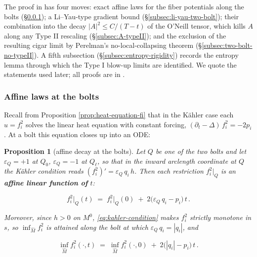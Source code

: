 \documentclass[11pt]{amsart}
\theoremstyle{plain}
\numberwithin{equation}{section}
\newtheorem{proposition}[theorem]{Proposition}
\theoremstyle{definition}
\theoremstyle{remark}
\begin{document}
The proof in \cite{FT} has four moves: exact affine laws for the fiber potentials along the bolts (\S\ref{subsec:bolt-affine}); a Li--Yau-type gradient bound (\S\ref{subsec:li-yau-two-bolt}); their combination into the decay $| A |^2 \leq C / ( T - t )$ of the O'Neill tensor, which kills $A$ along any Type II rescaling (\S\ref{subsec:A-typeII}); and the exclusion of the resulting cigar limit by Perelman's no-local-collapsing theorem (\S\ref{subsec:two-bolt-no-typeII}). A fifth subsection (\S\ref{subsec:entropy-rigidity}) records the entropy lemma through which the Type I blow-up limits are identified. We quote the statements used later; all proofs are in \cite{FT}.

\subsubsection{Affine laws at the bolts}\label{subsec:bolt-affine}


Recall from Proposition \ref{prop:heat-equation-fi} that in the Kähler case each $u = f_i^2$ solves the linear heat equation with constant forcing, $( \partial_t - \Delta )\, f_i^2 = -2 p_i$. At a bolt this equation closes up into an ODE:

\begin{proposition}[affine decay at the bolts]\label{prop:bolt-affine}
	Let $Q$ be one of the two bolts and let $\varepsilon_Q = +1$ at $Q_0$, $\varepsilon_Q = -1$ at $Q_\ell$, so that in the inward arclength coordinate at $Q$ the Kähler condition reads $( f_i^2 )' = \varepsilon_Q\, q_i\, h$. Then each restriction $f_i^2 |_Q$ is an \textbf{affine linear function of} $t$:
	
	\begin{equation}\label{eq:bolt-affine-law}
		f_i^2 \big|_Q (t) \;=\; f_i^2 \big|_Q (0) \;+\; 2 \big( \varepsilon_Q\, q_i - p_i \big)\, t \,.
	\end{equation}
	
	Moreover, since $h > 0$ on $M^0$, \eqref{eq:kahler-condition} makes $f_i^2$ strictly monotone in $s$, so $\inf_{\widehat{M}} f_i^2$ is attained along the bolt at which $\varepsilon_Q\, q_i = | q_i |$, and
	
	\begin{equation}\label{eq:bolt-vanishing}
		\inf_{\widehat{M}} f_i^2 (\cdot, t) \;=\; \inf_{\widehat{M}} f_i^2 (\cdot, 0) \;+\; 2 \big( | q_i | - p_i \big)\, t \,.
	\end{equation}
	
\end{proposition}
\end{document}
